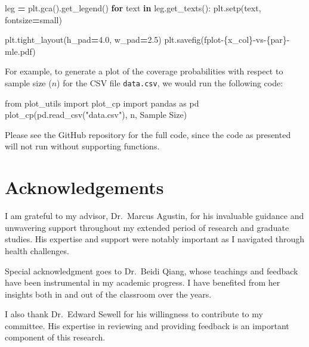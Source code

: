 \documentclass[
]{article}
\newenvironment{Shaded}{\begin{snugshade}}{\end{snugshade}}
\newcommand{\ControlFlowTok}[1]{\textcolor[rgb]{0.13,0.29,0.53}{\textbf{#1}}}
\newcommand{\FloatTok}[1]{\textcolor[rgb]{0.00,0.00,0.81}{#1}}
\newcommand{\ImportTok}[1]{#1}
\newcommand{\KeywordTok}[1]{\textcolor[rgb]{0.13,0.29,0.53}{\textbf{#1}}}
\newcommand{\NormalTok}[1]{#1}
\newcommand{\OperatorTok}[1]{\textcolor[rgb]{0.81,0.36,0.00}{\textbf{#1}}}
\newcommand{\SpecialCharTok}[1]{\textcolor[rgb]{0.00,0.00,0.00}{#1}}
\newcommand{\SpecialStringTok}[1]{\textcolor[rgb]{0.31,0.60,0.02}{#1}}
\newcommand{\StringTok}[1]{\textcolor[rgb]{0.31,0.60,0.02}{#1}}
\theoremstyle{definition}
\theoremstyle{plain}
\theoremstyle{definition}
\theoremstyle{definition}
\theoremstyle{definition}
\theoremstyle{definition}
\theoremstyle{remark}
\begin{document}
\begin{Shaded}
\begin{Highlighting}[]
\NormalTok{  leg }\OperatorTok{=}\NormalTok{ plt.gca().get\_legend()}
  \ControlFlowTok{for}\NormalTok{ text }\KeywordTok{in}\NormalTok{ leg.get\_texts():}
\NormalTok{    plt.setp(text, fontsize}\OperatorTok{=}\StringTok{\textquotesingle{}small\textquotesingle{}}\NormalTok{)}

\NormalTok{  plt.tight\_layout(h\_pad}\OperatorTok{=}\FloatTok{4.0}\NormalTok{, w\_pad}\OperatorTok{=}\FloatTok{2.5}\NormalTok{)}
\NormalTok{  plt.savefig(}\SpecialStringTok{f\textquotesingle{}plot{-}}\SpecialCharTok{\{}\NormalTok{x\_col}\SpecialCharTok{\}}\SpecialStringTok{{-}vs{-}}\SpecialCharTok{\{}\NormalTok{par}\SpecialCharTok{\}}\SpecialStringTok{{-}mle.pdf\textquotesingle{}}\NormalTok{)}
\end{Highlighting}
\end{Shaded}

For example, to generate a plot of the coverage probabilities with respect
to sample size (\(n\)) for the CSV file \texttt{data.csv}, we would run the following
code:

\begin{Shaded}
\begin{Highlighting}[]
\ImportTok{from}\NormalTok{ plot\_utils }\ImportTok{import}\NormalTok{ plot\_cp}
\ImportTok{import}\NormalTok{ pandas }\ImportTok{as}\NormalTok{ pd}
\NormalTok{plot\_cp(pd.read\_csv(}\StringTok{"data.csv"}\NormalTok{), }\StringTok{\textquotesingle{}n\textquotesingle{}}\NormalTok{, }\StringTok{\textquotesingle{}Sample Size\textquotesingle{}}\NormalTok{)}
\end{Highlighting}
\end{Shaded}

Please see the GitHub repository for the full code, since the code as presented
will not run without supporting functions.

\hypertarget{acknowledgements}{%
\section*{Acknowledgements}\label{acknowledgements}}

I am grateful to my advisor, Dr.~Marcus Agustin, for his invaluable guidance and
unwavering support throughout my extended period of research and graduate
studies. His expertise and support were notably important as I navigated through
health challenges.

Special acknowledgment goes to Dr.~Beidi Qiang, whose teachings and feedback
have been instrumental in my academic progress. I have benefited from her
insights both in and out of the classroom over the years.

I also thank Dr.~Edward Sewell for his willingness to contribute to my committee.
His expertise in reviewing and providing feedback is an important component of
this research.

  
\end{document}
